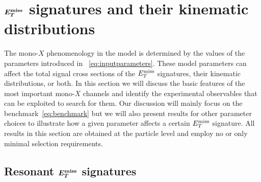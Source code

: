 \section{$\mbox{\boldmath$E_T^{\rm miss}$\unboldmath}$ signatures and their kinematic distributions}
\label{sec:experimentbasics}

The mono-$X$ phenomenology in the  \hdma model is determined by the values of the parameters introduced in ~\eqref{eq:inputparameters}. These model parameters can affect the total signal cross sections of the $E_T^\mathrm{miss}$ signatures, their kinematic distributions, or both. In this section we will discuss the basic features of the most important mono-$X$ channels and identify the experimental observables that can be exploited to search for them. Our discussion will  mainly focus on the benchmark~\eqref{eq:benchmark} but we will also present results for other parameter choices to illustrate how a given parameter affects a certain $E_T^\mathrm{miss}$ signature.  All results in this section are obtained at the particle level and employ no or only minimal selection requirements.

\subsection[Resonant $E_T^{\rm miss}$ signatures]{Resonant $\mbox{\boldmath$E_T^{\rm miss}$\unboldmath}$ signatures}
\label{sec:resonant}

